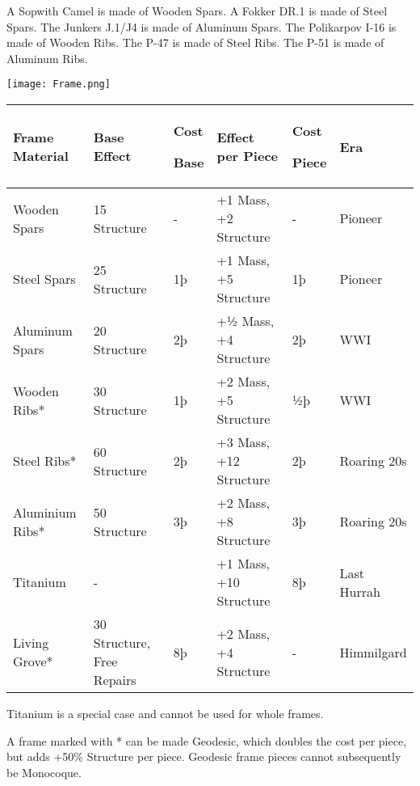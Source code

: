\documentclass{article}
\begin{document}
A Sopwith Camel is made of Wooden Spars. A Fokker DR.1 is made of
Steel Spars. The Junkers J.1/J4 is made of Aluminum Spars. The
Polikarpov I-16 is made of Wooden Ribs. The P-47 is made of Steel Ribs.
The P-51 is made of Aluminum Ribs.

\texttt{[image: Frame.png]}

\begin{tabular}{|l|l|l|l|l|l|}
  \hline
  Frame Material  & Base Effect                & Cost

  Base            & Effect per Piece           & Cost

  Piece           & Era                                                                                 \\\hline
  Wooden Spars    & 15 Structure               & -          & +1 Mass, +2 Structure  & -  & Pioneer     \\\hline
  Steel Spars     & 25 Structure               & 1þ         & +1 Mass, +5 Structure  & 1þ &
  Pioneer                                                                                               \\\hline
  Aluminum Spars  & 20 Structure               & 2þ         & +½ Mass, +4 Structure  & 2þ & WWI         \\\hline
  Wooden Ribs*    & 30 Structure               & 1þ         & +2 Mass, +5 Structure  & ½þ & WWI         \\\hline
  Steel Ribs*     & 60 Structure               & 2þ         & +3 Mass, +12 Structure & 2þ & Roaring
  20s                                                                                                   \\\hline
  Aluminium Ribs* & 50 Structure               & 3þ         & +2 Mass, +8 Structure  & 3þ &
  Roaring 20s                                                                                           \\\hline
  Titanium        & -                          &            & +1 Mass, +10 Structure & 8þ & Last Hurrah \\\hline
  Living Grove*   & 30 Structure, Free Repairs & 8þ         & +2 Mass, +4 Structure
                  & -                          & Himmilgard                                             \\\hline
\end{tabular}

Titanium is a special case and cannot be used for whole frames.

A frame marked with * can be made Geodesic, which doubles the
cost per piece, but adds +50\% Structure per piece. Geodesic frame
pieces cannot subsequently be Monocoque.
\end{document}
